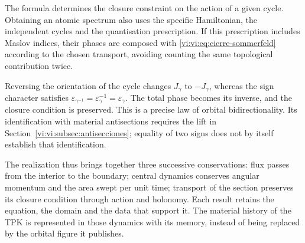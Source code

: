 The formula determines the closure constraint on the
action of a given cycle. Obtaining an atomic spectrum
also uses the specific Hamiltonian, the independent
cycles and the quantisation prescription. If this
prescription includes Maslov indices, their phases are
composed with \eqref{vi:vi:eq:cierre-sommerfeld} according to the
chosen transport, avoiding counting the same
topological contribution twice.

Reversing the orientation of the cycle changes $J_\gamma$ to
$-J_\gamma$, whereas the sign character satisfies
$\varepsilon_{\gamma^{-1}}=\varepsilon_\gamma^{-1}
=\varepsilon_\gamma$. The total phase becomes its
inverse, and the closure condition is preserved. This is a
precise law of orbital bidirectionality. Its identification
with material antisections requires the lift
in Section~\ref{vi:vi:subsec:antisecciones}; equality
of two signs does not by itself establish that identification.

The realization thus brings together three successive
conservations: flux passes from the interior to the boundary;
central dynamics conserves angular momentum and the area
swept per unit time; transport of the section
preserves its closure condition through action and
holonomy. Each result retains the equation, the domain
and the data that support it. The material history of the
TPK is represented in those dynamics with its memory, instead
of being replaced by the orbital figure it publishes.
